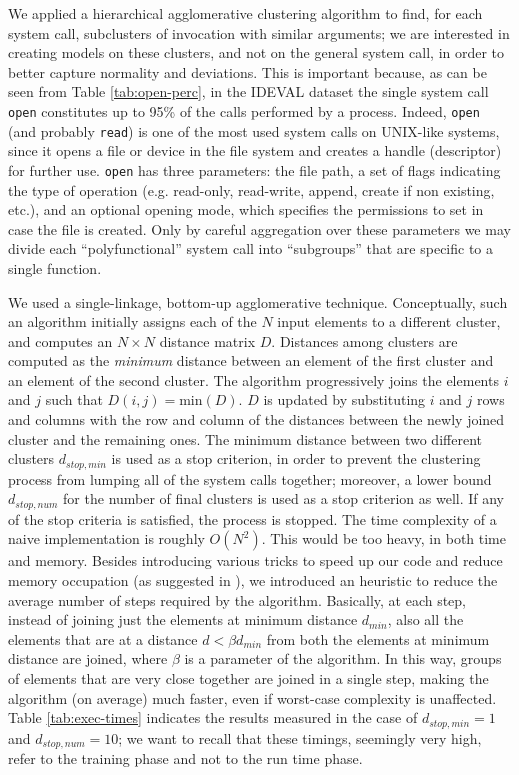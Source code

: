 We applied a hierarchical agglomerative clustering algorithm
\citep{kamber} to find, for each system call, subclusters of
invocation with similar arguments; we are interested in creating
models on these clusters, and not on the general system call, in order
to better capture normality and deviations. This is important because,
as can be seen from Table \ref{tab:open-perc}, in the
\ac{IDEVAL} dataset the single system call \texttt{open}
constitutes up to 95\% of the calls performed by a process. Indeed,
\texttt{open} (and probably \texttt{read}) is one of the most used
system calls on UNIX-like systems, since it opens a file or device in
the file system and creates a handle (descriptor) for further
use. \texttt{open} has three parameters: the file path, a set of flags
indicating the type of operation (e.g. read-only, read-write, append,
create if non existing, etc.), and an optional opening mode, which
specifies the permissions to set in case the file is created. Only by
careful aggregation over these parameters we may divide each
``polyfunctional'' system call into ``subgroups'' that are specific to
a single function.

We used a single-linkage, bottom-up agglomerative
technique. Conceptually, such an algorithm initially assigns each of
the $N$ input elements to a different cluster, and computes an $N
\times N$ distance matrix $D$. Distances among clusters are computed
as the \emph{minimum} distance between an element of the first cluster
and an element of the second cluster. The algorithm progressively
joins the elements $i$ and $j$ such that $D(i,j) =
\mathrm{min}(D)$. $D$ is updated by substituting $i$ and $j$ rows and
columns with the row and column of the distances between the newly
joined cluster and the remaining ones. The minimum distance between
two different clusters $d_{stop,min}$ is used as a stop criterion, in
order to prevent the clustering process from lumping all of the system
calls together; moreover, a lower bound $d_{stop,num}$ for the number
of final clusters is used as a stop criterion as well. If any of the
stop criteria is satisfied, the process is stopped. The time
complexity of a naive implementation is roughly $O(N^2)$. This would
be too heavy, in both time and memory. Besides introducing various
tricks to speed up our code and reduce memory occupation (as suggested
in \citep{golub}), we introduced an heuristic to reduce the average
number of steps required by the algorithm. Basically, at each step,
instead of joining just the elements at minimum distance $d_{min}$,
also all the elements that are at a distance $d < \beta d_{min}$ from
both the elements at minimum distance are joined, where $\beta$ is a
parameter of the algorithm. In this way, groups of elements that are
very close together are joined in a single step, making the algorithm
(on average) much faster, even if worst-case complexity is
unaffected. Table \ref{tab:exec-times} indicates the results measured
in the case of $d_{stop,min} = 1$ and $d_{stop,num} = 10$; we want to
recall that these timings, seemingly very high, refer to the training
phase and not to the run time phase.

